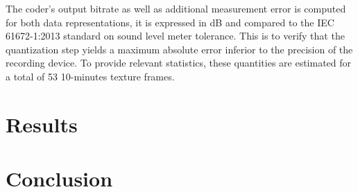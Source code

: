 \documentclass[final,3p,times,twocolumn]{elsarticle}
\begin{document}
The coder's output bitrate as well as additional measurement error is computed for both data representations, it is expressed in dB and compared to the IEC 61672-1:2013 standard on sound level meter tolerance. This is to verify that the quantization step yields a maximum absolute error inferior to the precision of the recording device. To provide relevant statistics, these quantities are estimated for a total of 53 10-minutes texture frames.\\

\section{Results}

\section{Conclusion}

\clearpage



\end{document}
